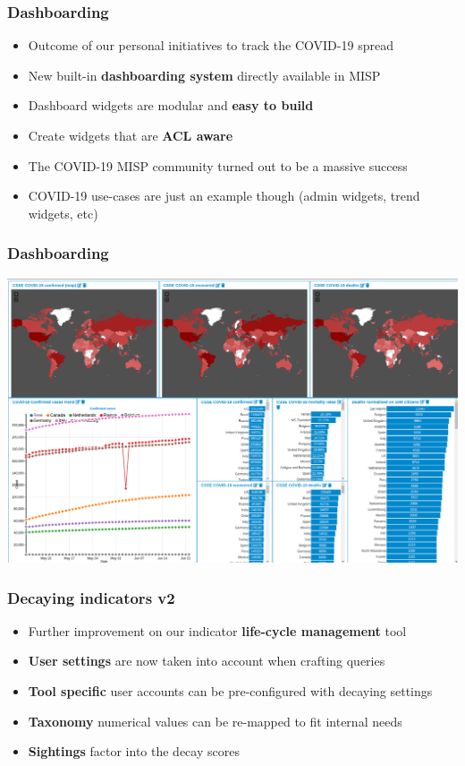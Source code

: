 \begin{frame}
\frametitle{Dashboarding}
\begin{itemize}
	\item Outcome of our personal initiatives to track the COVID-19 spread
        \item New built-in {\bf dashboarding system} directly available in MISP
        \item Dashboard widgets are modular and {\bf easy to build}
        \item Create widgets that are {\bf ACL aware}
        \item The COVID-19 MISP community turned out to be a massive success
        \item COVID-19 use-cases are just an example though (admin widgets, trend widgets, etc)
\end{itemize}
\end{frame}

\begin{frame}
\frametitle{Dashboarding}
\includegraphics[scale=0.25]{images/dashboard.png}
\end{frame}


\begin{frame}
\frametitle{Decaying indicators v2}
\begin{itemize}
        \item Further improvement on our indicator {\bf life-cycle management} tool
	\item {\bf User settings} are now taken into account when crafting queries
        \item {\bf Tool specific} user accounts can be pre-configured with decaying settings
        \item {\bf Taxonomy} numerical values can be re-mapped to fit internal needs
        \item {\bf Sightings} factor into the decay scores
\end{itemize}
\end{frame}

